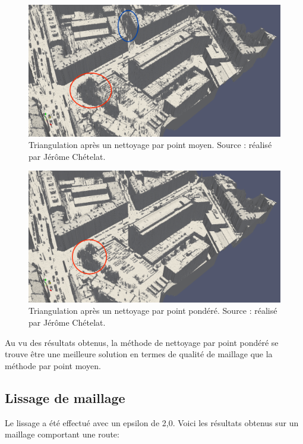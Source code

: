 \begin{figure}[htbp!]
    \centering
	\includegraphics[width=0.9\linewidth]{figures/filters/hepia_filtered_avg_stl.png}
	\caption{Triangulation après un nettoyage par point moyen. Source : réalisé par Jérôme Chételat.}
	\label{fig:hepia_filt_avg_stl}
\end{figure}

\begin{figure}[htbp!]
    \centering
	\includegraphics[width=0.9\linewidth]{figures/filters/hepia_filtered_pond_stl.png}
	\caption{Triangulation après un nettoyage par point pondéré. Source : réalisé par Jérôme Chételat.}
	\label{fig:hepia_filt_pond_stl}
\end{figure}

Au vu des résultats obtenus, la méthode de nettoyage par point pondéré se trouve
être une meilleure solution en termes de qualité de maillage que la méthode par point moyen.

\newpage
\subsection{Lissage de maillage}

Le lissage a été effectué avec un epsilon de 2,0.
Voici les résultats obtenus sur un maillage comportant une route: 

